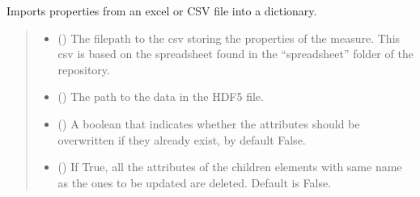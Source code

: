 \documentclass[letterpaper,10pt,english]{sphinxmanual}
\begin{document}
\begin{fulllineitems}
\begin{fulllineitems}
\begin{quote}
\begin{description}
\end{description}\end{quote}

\end{fulllineitems}


\begin{fulllineitems}
\label{\detokenize{source/HDF5_BLS:HDF5_BLS.wrapper.Wrapper.import_properties_data}}
\pysigstartsignatures
\pysiglinewithargsret
{}
{\sphinxparamcomma {}\sphinxparamcomma {}\sphinxparamcomma {}}
{}
\pysigstopsignatures
\sphinxAtStartPar
Imports properties from an excel or CSV file into a dictionary.
\begin{quote}\begin{description}
\begin{itemize}
\item {} 
\sphinxAtStartPar
{} () \textendash{} The filepath to the csv storing the properties of the measure. This csv is based on the spreadsheet found in the “spreadsheet” folder of the repository.

\item {} 
\sphinxAtStartPar
{} () \textendash{} The path to the data in the HDF5 file.

\item {} 
\sphinxAtStartPar
{} (\sphinxstyleliteralemphasis{\sphinxupquote{, }}) \textendash{} A boolean that indicates whether the attributes should be overwritten if they already exist, by default False.

\item {} 
\sphinxAtStartPar
{} (\sphinxstyleliteralemphasis{\sphinxupquote{, }}) \textendash{} If True, all the attributes of the children elements with same name as the ones to be updated are deleted. Default is False.


\end{itemize}
\end{description}
\end{quote}
\end{fulllineitems}
\end{fulllineitems}
\end{document}
